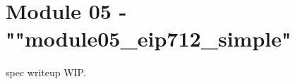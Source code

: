 \newpage
\section{Module 05 - {\ttfamily ""module05\_eip712\_simple"}}
\label{sec:module05_predicate}

spec writeup WIP.

